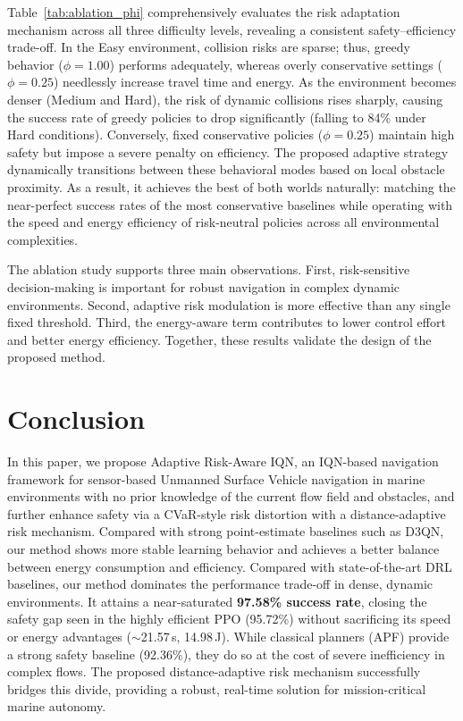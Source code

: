 \documentclass[runningheads]{llncs}
\begin{document}
Table~\ref{tab:ablation_phi} comprehensively evaluates the risk adaptation mechanism across all three difficulty levels, revealing a consistent safety--efficiency trade-off.
In the Easy environment, collision risks are sparse; thus, greedy behavior ($\phi=1.00$) performs adequately, whereas overly conservative settings ($\phi=0.25$) needlessly increase travel time and energy.
As the environment becomes denser (Medium and Hard), the risk of dynamic collisions rises sharply, causing the success rate of greedy policies to drop significantly (falling to 84\% under Hard conditions).
Conversely, fixed conservative policies ($\phi=0.25$) maintain high safety but impose a severe penalty on efficiency.
The proposed adaptive strategy dynamically transitions between these behavioral modes based on local obstacle proximity. As a result, it achieves the best of both worlds naturally: matching the near-perfect success rates of the most conservative baselines while operating with the speed and energy efficiency of risk-neutral policies across all environmental complexities.

The ablation study supports three main observations.
First, risk-sensitive decision-making is important for robust navigation in complex dynamic environments.
Second, adaptive risk modulation is more effective than any single fixed threshold.
Third, the energy-aware term contributes to lower control effort and better energy efficiency.
Together, these results validate the design of the proposed method.



\section{Conclusion}

In this paper, we propose Adaptive Risk-Aware IQN, an IQN-based navigation framework for sensor-based Unmanned Surface Vehicle navigation in marine environments with no prior knowledge of the current flow field and obstacles, and further enhance safety via a CVaR-style risk distortion with a distance-adaptive risk mechanism. Compared with strong point-estimate baselines such as D3QN, our method shows more stable learning behavior and achieves a better balance between energy consumption and efficiency.
Compared with state-of-the-art DRL baselines, our method dominates the performance trade-off in dense, dynamic environments. It attains a near-saturated \textbf{97.58\% success rate}, closing the safety gap seen in the highly efficient PPO (95.72\%) without sacrificing its speed or energy advantages ($\sim$21.57\,s, 14.98\,J). While classical planners (APF) provide a strong safety baseline (92.36\%), they do so at the cost of severe inefficiency in complex flows. The proposed distance-adaptive risk mechanism successfully bridges this divide, providing a robust, real-time solution for mission-critical marine autonomy.
\end{document}
